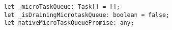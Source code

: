 \begin{verbatim}
let _microTaskQueue: Task[] = [];
let _isDrainingMicrotaskQueue: boolean = false;
let nativeMicroTaskQueuePromise: any;
\end{verbatim}
